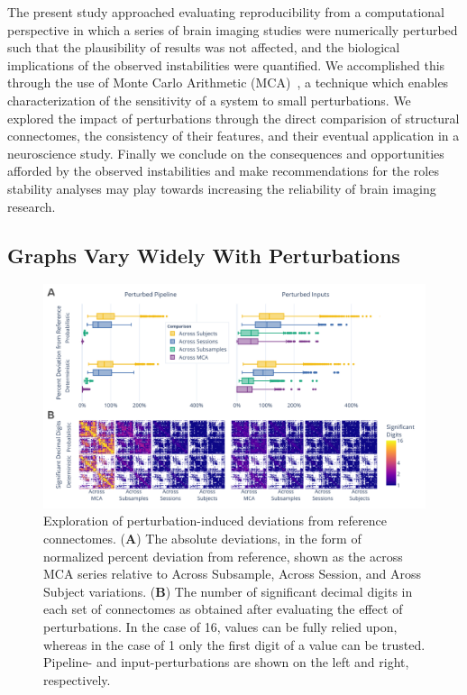 \documentclass[fleqn,10pt]{SelfArx} %
\begin{document}
The present study approached evaluating reproducibility from a computational perspective in which a series of brain
imaging studies were numerically perturbed such that the plausibility of results was not affected, and the biological
implications of the observed instabilities were quantified. We accomplished this through the use of Monte Carlo
Arithmetic (MCA)~\cite{Parker1997-qq}, a technique which enables characterization of the sensitivity of a system to
small perturbations. We explored the impact of perturbations through the direct comparision of structural connectomes,
the consistency of their features, and their eventual application in a neuroscience study. Finally we conclude on the
consequences and opportunities afforded by the observed instabilities and make recommendations for the roles stability
analyses may play towards increasing the reliability of brain imaging research.

\subsection*{Graphs Vary Widely With Perturbations}
\begin{figure}[hbt]\centering
\includegraphics[width=0.98\linewidth]{figures/fig1_absolute_differences.pdf}
\caption{Exploration of perturbation-induced deviations from reference connectomes.
(\textbf{A}) The absolute deviations, in the form of normalized percent deviation from reference, shown as the
across MCA series relative to Across Subsample, Across Session, and Aross Subject variations.
(\textbf{B}) The number of significant decimal digits in each set of connectomes as obtained after evaluating the
effect of perturbations. In the case of 16, values can be fully relied upon, whereas in the case of 1 only the first
digit of a value can be trusted. Pipeline- and input-perturbations are shown on the left and right, respectively.}
\label{fig:absolute}
\end{figure}
\end{document}
